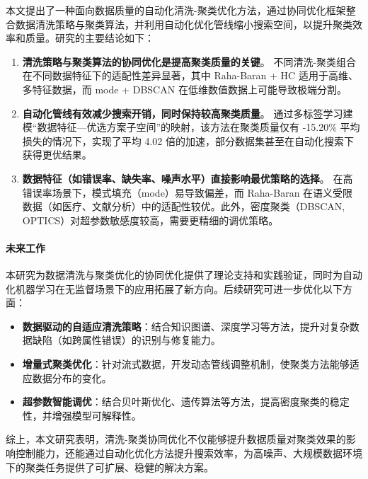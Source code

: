 \documentclass[10pt]{article} %
\numberwithin{equation}{section}
\begin{document}
本文提出了一种面向数据质量的自动化清洗-聚类优化方法，通过协同优化框架整合数据清洗策略与聚类算法，并利用自动化优化管线缩小搜索空间，以提升聚类效率和质量。研究的主要结论如下：

\begin{enumerate}
    \item \textbf{清洗策略与聚类算法的协同优化是提高聚类质量的关键}。  
    不同清洗-聚类组合在不同数据特征下的适配性差异显著，其中 Raha-Baran + HC 适用于高维、多特征数据，而 mode + DBSCAN 在低维数值数据上可能导致极端分割。

    \item \textbf{自动化管线有效减少搜索开销，同时保持较高聚类质量}。  
    通过多标签学习建模“数据特征—优选方案子空间”的映射，该方法在聚类质量仅有 -15.20\% 平均损失的情况下，实现了平均 4.02 倍的加速，部分数据集甚至在自动化搜索下获得更优结果。

    \item \textbf{数据特征（如错误率、缺失率、噪声水平）直接影响最优策略的选择}。  
    在高错误率场景下，模式填充（mode）易导致偏差，而 Raha-Baran 在语义受限数据（如医疗、文献分析）中的适配性较优。此外，密度聚类（DBSCAN, OPTICS）对超参数敏感度较高，需要更精细的调优策略。
\end{enumerate}

\paragraph{未来工作}  
本研究为数据清洗与聚类优化的协同优化提供了理论支持和实践验证，同时为自动化机器学习在无监督场景下的应用拓展了新方向。后续研究可进一步优化以下方面：

\begin{itemize}
    \item \textbf{数据驱动的自适应清洗策略}：结合知识图谱、深度学习等方法，提升对复杂数据缺陷（如跨属性错误）的识别与修复能力。
    \item \textbf{增量式聚类优化}：针对流式数据，开发动态管线调整机制，使聚类方法能够适应数据分布的变化。
    \item \textbf{超参数智能调优}：结合贝叶斯优化、遗传算法等方法，提高密度聚类的稳定性，并增强模型可解释性。
\end{itemize}

综上，本文研究表明，清洗-聚类协同优化不仅能够提升数据质量对聚类效果的影响控制能力，还能通过自动化优化方法提升搜索效率，为高噪声、大规模数据环境下的聚类任务提供了可扩展、稳健的解决方案。



\end{document}
